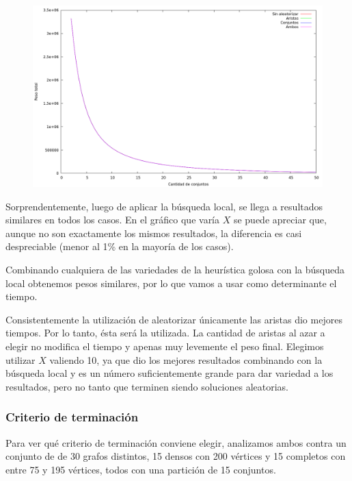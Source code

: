 \begin{figure}[H]
  \begin{center}
    \includegraphics[scale=0.35]{imagenes/grasp-local-k-peso.png}
  \end{center}
\end{figure}

Sorprendentemente, luego de aplicar la búsqueda local, se llega a resultados
similares en todos los casos. En el gráfico que varía $X$ se puede apreciar
que, aunque no son exactamente los mismos resultados, la diferencia es casi
despreciable (menor al 1\% en la mayoría de los casos).

Combinando cualquiera de las variedades de la heurística golosa con la
búsqueda local obtenemos pesos similares, por lo que vamos a usar como
determinante el tiempo.

Consistentemente la utilización de aleatorizar únicamente las aristas dio
mejores tiempos. Por lo tanto, ésta será la utilizada. La cantidad de aristas
al azar a elegir no modifica el tiempo y apenas muy levemente el peso final.
Elegimos utilizar $X$ valiendo 10, ya que dio los mejores resultados combinando
con la búsqueda local y es un número suficientemente grande para dar variedad a
los resultados, pero no tanto que terminen siendo soluciones aleatorias.

\newpage \subsubsection{Criterio de terminación}

Para ver qué criterio de terminación conviene elegir, analizamos ambos contra
un conjunto de de 30 grafos distintos, 15 densos con 200 vértices y 15 completos
con entre 75 y 195 vértices, todos con una partición de 15 conjuntos.

